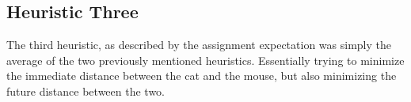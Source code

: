 \documentclass{article}
\begin{document}
\subsection{Heuristic Three}
The third heuristic, as described by the assignment expectation was simply the average of the two previously mentioned heuristics. Essentially trying to minimize the immediate distance between the cat and the mouse, but also minimizing the future distance between the two.
\end{document}

